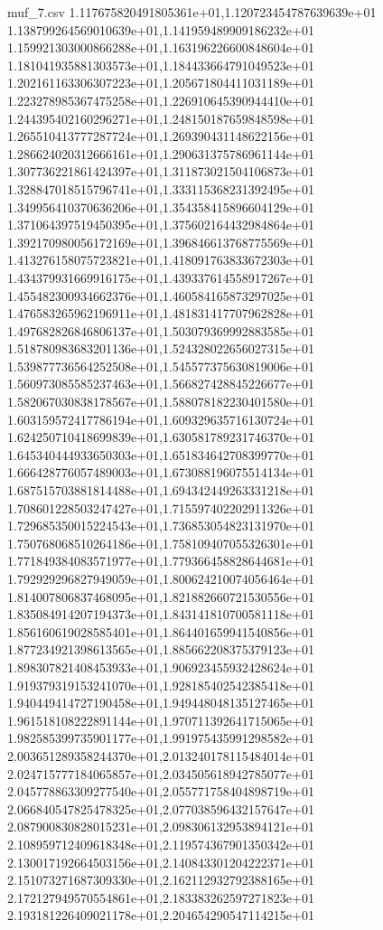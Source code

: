 \begin{filecontents*}{muf_7.csv}
1.117675820491805361e+01,1.120723454787639639e+01
1.138799264569010639e+01,1.141959489909186232e+01
1.159921303000866288e+01,1.163196226600848604e+01
1.181041935881303573e+01,1.184433664791049523e+01
1.202161163306307223e+01,1.205671804411031189e+01
1.223278985367475258e+01,1.226910645390944410e+01
1.244395402160296271e+01,1.248150187659848598e+01
1.265510413777287724e+01,1.269390431148622156e+01
1.286624020312666161e+01,1.290631375786961144e+01
1.307736221861424397e+01,1.311873021504106873e+01
1.328847018515796741e+01,1.333115368231392495e+01
1.349956410370636206e+01,1.354358415896604129e+01
1.371064397519450395e+01,1.375602164432984864e+01
1.392170980056172169e+01,1.396846613768775569e+01
1.413276158075723821e+01,1.418091763833672303e+01
1.434379931669916175e+01,1.439337614558917267e+01
1.455482300934662376e+01,1.460584165873297025e+01
1.476583265962196911e+01,1.481831417707962828e+01
1.497682826846806137e+01,1.503079369992883585e+01
1.518780983683201136e+01,1.524328022656027315e+01
1.539877736564252508e+01,1.545577375630819006e+01
1.560973085585237463e+01,1.566827428845226677e+01
1.582067030838178567e+01,1.588078182230401580e+01
1.603159572417786194e+01,1.609329635716130724e+01
1.624250710418699839e+01,1.630581789231746370e+01
1.645340444933650303e+01,1.651834642708399770e+01
1.666428776057489003e+01,1.673088196075514134e+01
1.687515703881814488e+01,1.694342449263331218e+01
1.708601228503247427e+01,1.715597402202911326e+01
1.729685350015224543e+01,1.736853054823131970e+01
1.750768068510264186e+01,1.758109407055326301e+01
1.771849384083571977e+01,1.779366458828644681e+01
1.792929296827949059e+01,1.800624210074056464e+01
1.814007806837468095e+01,1.821882660721530556e+01
1.835084914207194373e+01,1.843141810700581118e+01
1.856160619028585401e+01,1.864401659941540856e+01
1.877234921398613565e+01,1.885662208375379123e+01
1.898307821408453933e+01,1.906923455932428624e+01
1.919379319153241070e+01,1.928185402542385418e+01
1.940449414727190458e+01,1.949448048135127465e+01
1.961518108222891144e+01,1.970711392641715065e+01
1.982585399735901177e+01,1.991975435991298582e+01
2.003651289358244370e+01,2.013240178115484014e+01
2.024715777184065857e+01,2.034505618942785077e+01
2.045778863309277540e+01,2.055771758404898719e+01
2.066840547825478325e+01,2.077038596432157647e+01
2.087900830828015231e+01,2.098306132953894121e+01
2.108959712409618348e+01,2.119574367901350342e+01
2.130017192664503156e+01,2.140843301204222371e+01
2.151073271687309330e+01,2.162112932792388165e+01
2.172127949570554861e+01,2.183383262597271823e+01
2.193181226409021178e+01,2.204654290547114215e+01

\end{filecontents*}
